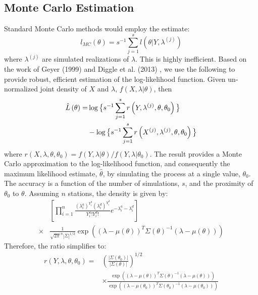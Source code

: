 \documentclass{acm_proc_article-sp}
\begin{document}
\subsection{Monte Carlo Estimation} \label{mc_estimation}
Standard Monte Carlo methods would employ the estimate:
\begin{equation}
l_{MC} (\theta) = s^{-1} \sum_{j=1}^s l \left( \theta | Y, \lambda^{(j)} \right)
\end{equation}
\noindent where $\lambda^{(j)}$ are simulated realizations of $\lambda$.  This is highly inefficient.  Based on the work of Geyer (1999) \cite{geyer:likinf} and Diggle et al. (2013) \cite{diggle:spatial}, we use the following to provide robust, efficient estimation of the log-likelihood function.  Given un-normalized joint density of $X$ and $\lambda$, $f(X, \lambda | \theta)$, then 
\begin{align}
\hat{L} \left( \theta \right) =& \log \big \{ s^{-1} \sum_{j=1}^s r \left( Y , \lambda^{(j)} , \theta, \theta_0 \right) \big \} \label{approx_lik} \\
&- \log \big \{ s^{-1} \sum_{j=1}^s r \left( X^{(j)} , \lambda^{(j)} , \theta, \theta_0 \right) \big \} \notag
\end{align}
\noindent where $r(X, \lambda, \theta, \theta_0) = f(Y, \lambda | \theta)/f(Y, \lambda | \theta_0)$. The result provides a Monte Carlo approximation to the log-likelihood function, and consequently the maximum likelihood estimate, $\hat{\theta}$, by simulating the process at a single value, $\theta_0$.  The accuracy is a function of the number of simulations, $s$, and the proximity of $\theta_0$ to $\theta$.   Assuming $n$ stations, the density is given by:
\begin{align*}
&\left[ \prod_{i=1}^n \frac{(\lambda_i^a)^{Y_i^a}(\lambda_i^d)^{Y_i^d}}{Y_i^a ! Y_i^d !} e^{-\lambda_i^a - \lambda_i^d} \right] \\
\times& \frac{1}{\sqrt{2 \pi}^n |\Sigma|^{1/2}} \exp \left( (\lambda - \mu(\theta))^T \Sigma(\theta)^{-1} (\lambda - \mu(\theta) ) \right)
\end{align*}
Therefore, the ratio simplifies to:
\begin{align*}
r(Y,\lambda, \theta, \theta_0) =& \left(\frac{|\Sigma (\theta_0)|}{|\Sigma (\theta)|} \right)^{1/2} \\
&\times \frac{\exp \left( (\lambda - \mu(\theta))^T \Sigma(\theta)^{-1} (\lambda - \mu(\theta) ) \right)}{\exp \left( (\lambda - \mu(\theta_0))^T \Sigma(\theta_0)^{-1} (\lambda - \mu(\theta_0) ) \right)} \\
\end{align*}
\end{document}
